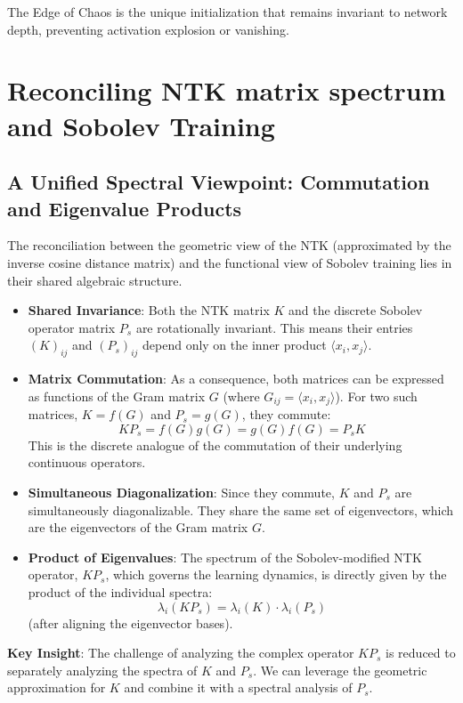 \documentclass{article}
\begin{document}
The Edge of Chaos is the unique initialization that remains invariant to network depth, preventing activation explosion or vanishing.

\section{Reconciling NTK matrix spectrum and Sobolev Training}

\subsection{A Unified Spectral Viewpoint: Commutation and Eigenvalue Products}

The reconciliation between the geometric view of the NTK (approximated by the inverse cosine distance matrix) and the functional view of Sobolev training lies in their shared algebraic structure.

\begin{itemize}
    \item \textbf{Shared Invariance}: Both the NTK matrix $K$ and the discrete Sobolev operator matrix $P_s$ are rotationally invariant. This means their entries $(K)_{ij}$ and $(P_s)_{ij}$ depend only on the inner product $\langle x_i, x_j \rangle$.
    
    \item \textbf{Matrix Commutation}: As a consequence, both matrices can be expressed as functions of the Gram matrix $G$ (where $G_{ij} = \langle x_i, x_j \rangle$). For two such matrices, $K=f(G)$ and $P_s=g(G)$, they commute:
    \[ K P_s = f(G)g(G) = g(G)f(G) = P_s K \]
    This is the discrete analogue of the commutation of their underlying continuous operators.
    
    \item \textbf{Simultaneous Diagonalization}: Since they commute, $K$ and $P_s$ are simultaneously diagonalizable. They share the same set of eigenvectors, which are the eigenvectors of the Gram matrix $G$.
    
    \item \textbf{Product of Eigenvalues}: The spectrum of the Sobolev-modified NTK operator, $K P_s$, which governs the learning dynamics, is directly given by the product of the individual spectra:
    \[ \lambda_i(K P_s) = \lambda_i(K) \cdot \lambda_i(P_s) \]
    (after aligning the eigenvector bases).
\end{itemize}

\textbf{Key Insight}: The challenge of analyzing the complex operator $K P_s$ is reduced to separately analyzing the spectra of $K$ and $P_s$. We can leverage the geometric approximation for $K$ and combine it with a spectral analysis of $P_s$.
\end{document}

